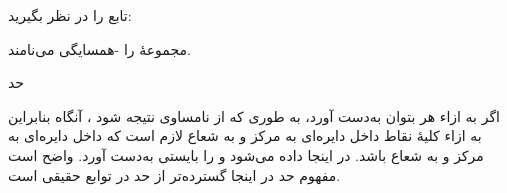 \EMhold


\begin{EMunit}



\end{EMunit}

\begin{EMexample}{}

تابع  را در نظر بگیرید:

\end{EMexample}

\EMhold


\begin{EMunit}



\end{EMunit}

مجموعهٔ  را \EMim{\rho}-همسایگی  می‌نامند.

\EMhold


\begin{EMdefinition}{حد}

اگر به ازاء هر  بتوان  به‌دست آورد، به طوری که از نامساوی  نتیجه شود ، آنگاه
بنابراین به ازاء کلیهٔ نقاط داخل دایره‌ای به مرکز  و به شعاع \EMim{\delta} لازم است که  داخل دایره‌ای به مرکز  و به شعاع \EMim{\varepsilon} باشد. در اینجا \EMim{\varepsilon} داده می‌شود و \EMim{\delta(\varepsilon)} را بایستی به‌دست آورد. واضح است مفهوم حد در اینجا گسترده‌تر از حد در توابع حقیقی است.

\end{EMdefinition}

